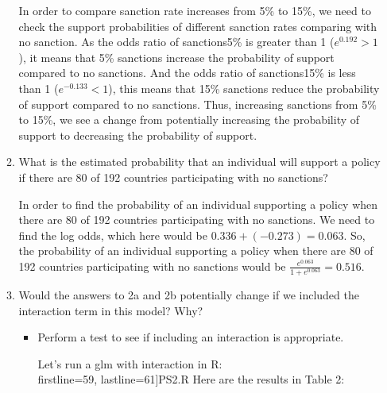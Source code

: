 \documentclass[12pt,letterpaper]{article}
\begin{document}
\begin{enumerate}
\begin{enumerate}
\noindent In order to compare sanction rate increases from 5\% to 15\%, we need to check the support probabilities of different sanction rates comparing with no sanction. As the odds ratio of sanctions5\% is greater than 1 ($e^{0.192}>1$), it means that 5\% sanctions increase the probability of support compared to no sanctions. And the odds ratio of sanctions15\% is less than 1 ($e^{-0.133}<1$), this means that 15\% sanctions reduce the probability of support compared to no sanctions. Thus, increasing sanctions from 5\% to 15\%, we see a change from potentially increasing the probability of support to decreasing the probability of support.


		\item
		What is the estimated probability that an individual will support a policy if there are 80 of 192 countries participating with no sanctions? 

\noindent In order to find the probability of an individual supporting a policy when there are 80 of 192 countries participating with no sanctions. We need to find the log odds, which here would be $ 0.336 + (-0.273) = 0.063.$ So, the probability of an individual supporting a policy when there are 80 of 192 countries participating with no sanctions would be $\frac{e^{0.063}}{1+e^{0.063}} = 0.516$.
		
		\item
		Would the answers to 2a and 2b potentially change if we included the interaction term in this model? Why? 
		\begin{itemize}
			\item Perform a test to see if including an interaction is appropriate.

\noindent Let's run a glm with interaction in R:\\
		 firstline=59, lastline=61]{PS2.R}
\noindent Here are the results in Table 2:\\


\end{itemize}
\end{enumerate}
\end{enumerate}
\end{document}
